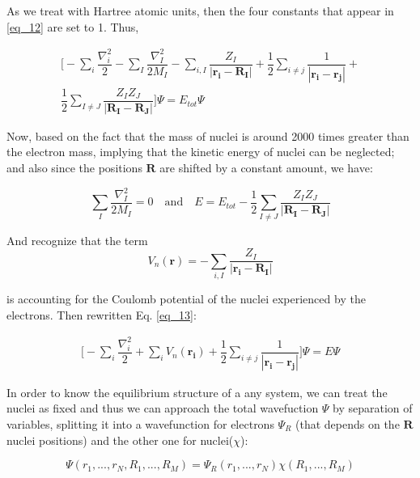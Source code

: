 As we treat with Hartree atomic units, then the four constants that appear in \ref{eq_12} are set to 1. Thus,

\begin{equation} \label{eq_13}
\begin{split}
    \Biggl[-\sum_{i}\dfrac{\nabla_{i}^{2}}{2} -\sum_{I}\dfrac{\nabla_{I}^{2}}{2M_I} -\sum_{i,I} \dfrac{Z_I}{|\mathbf{r_i}-\mathbf{R_I}|}+\dfrac{1}{2}\sum_{i\neq j}\dfrac{1}{|\mathbf{r_i}-\mathbf{r_j}|}+ \\
    \dfrac{1}{2}\sum_{I\neq J}\dfrac{Z_{I}Z_{J}}{|\mathbf{R_I}-\mathbf{R_J}|} \Biggr]\Psi = E_{tot} \Psi
\end{split}
\end{equation}

Now, based on the fact that the mass of nuclei is around 2000 times greater than the electron mass, implying that the kinetic energy of nuclei can be neglected; and also since the positions $\mathbf{R}$ are shifted by a constant amount, we have:

\begin{equation}
\sum_{I}\dfrac{\nabla_{I}^{2}}{2M_I} = 0
\quad \mbox{and} \quad
E=E_{tot}-\dfrac{1}{2}\sum_{I\neq J}\dfrac{Z_{I}Z_{J}}{|\mathbf{R_I}-\mathbf{R_J}|}
\end{equation}


And recognize that the term 
\begin{equation}
V_{n}(\mathbf{r})= -\sum_{i,I} \dfrac{Z_I}{|\mathbf{r_i}-\mathbf{R_I}|}
\end{equation}

is accounting for the Coulomb potential of the nuclei experienced by the electrons. Then rewritten Eq. \ref{eq_13}:

\begin{equation} \label{eq_15}
	\begin{split}
		\Biggl[-\sum_{i}\dfrac{\nabla_{i}^{2}}{2} +\sum_{i}V_{n}(\mathbf{r_i})+\dfrac{1}{2}\sum_{i\neq j} \dfrac{1}{|\mathbf{r_i}-\mathbf{r_{j}}|}  \Biggr]\Psi =E \Psi
	\end{split}
\end{equation}

In order to know the equilibrium structure of a any system, we can treat the nuclei as fixed and thus we can approach the total wavefuction $\Psi$ by separation of variables, splitting it into a wavefunction for electrons $\Psi_R$ (that depends on the $\mathbf{R}$ nuclei positions) and the other one for nuclei($\chi$):

\begin{equation} \label{eq_16}
    \Psi \left(r_1,..., r_N, R_1, ..., R_M \right) = \Psi_R \left(r_1, ..., r_N\right) \chi\left(R_1, ..., R_M \right)
\end{equation}

